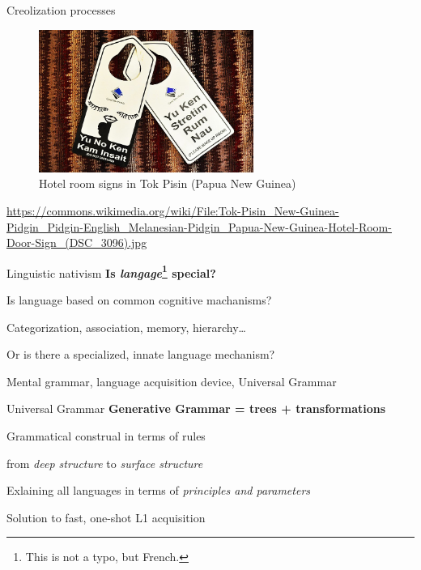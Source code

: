 \documentclass[aspectratio=169,cramped]{beamer}
\let\tempone\itemize
\let\temptwo\enditemize
\renewenvironment{itemize}{\tempone\addtolength{\itemsep}{-0\baselineskip}\addtolength{\parskip}{-0.2\baselineskip}}{\temptwo}
\newcommand{\ex}[1]{{\color{teal} #1}}
\begin{document}
\begin{frame}{Creolization processes}
  \vspace{-1cm}
  \begin{figure}
    \centering
    \includegraphics[width=7cm]{figures/hotel-sign.jpg}
    \caption{Hotel room signs in Tok Pisin (Papua New Guinea)}
  \end{figure}
  \vspace{-.1cm} \tiny \url{https://commons.wikimedia.org/wiki/File:Tok-Pisin_New-Guinea-Pidgin_Pidgin-English_Melanesian-Pidgin_Papua-New-Guinea-Hotel-Room-Door-Sign_(DSC_3096).jpg}
\end{frame}

\begin{frame}{Linguistic nativism}
	\textbf{Is \textit{langage}\footnote{This is not a typo, but French.} special?}
	\begin{itemize}
  \item Is language based on common cognitive machanisms?
    \begin{itemize}
    \item \ex{Categorization, association, memory, hierarchy\ldots}
    \end{itemize}
  \item Or is there a specialized, innate language mechanism?
    \begin{itemize}
    \item \ex{Mental grammar, language acquisition device, Universal Grammar}
    \end{itemize}
  \end{itemize}
\end{frame}

\begin{frame}{Universal Grammar}
	\textbf{Generative Grammar = trees + transformations}
	\begin{itemize}
  \item Grammatical construal in terms of rules
    \begin{itemize}
    \item from \emph{deep structure} to \emph{surface structure}
    \end{itemize}
  \item Exlaining all languages in terms of \emph{principles and parameters}
    \begin{itemize}
    \item Solution to fast, one-shot L1 acquisition
    \end{itemize}
  \end{itemize}
\end{frame}
\end{document}
